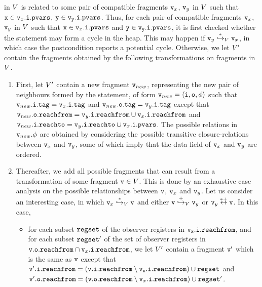 in $\fragset$ is related to some pair of compatible fragments $\frag_x$, $\frag_y$ in $\fragset$ such that $\lvarof{x} \in \pvarsat{\inof{\frag_x}}$, $\tt y \in \pvarsat{\inof{\frag_y}}$. 
Thus, for each pair of compatible fragments $\frag_x$, $\frag_y$ in $\fragset$ such that $\lvarof{x} \in \pvarsat{\inof{\frag_x}}$ and $\tt y \in \pvarsat{\inof{\frag_y}}$, it is first checked whether the statement may form
a cycle in the heap. This may happen if
$\frag_y \overset{*}\hookrightarrow_{\fragset}\frag_x$, in which case the postcondition reports a potential cycle.
Otherwise, we let $\fragsetpost$ contain
the fragments obtained by the following transformations on fragments in
$\fragset$.
\begin{enumerate}
  \item
    First, let $\fragsetpost$ contain a new fragment $\frag_{new}$, representing
    the new pair of neighbours formed by the statement, of form
    $\frag_{new} = \fragtupleat{\frag_{new}}$ such that
    $\tagat{\inof{\frag_{new}}} = \tagat{\inof{\frag_x}}$ and
    $\tagat{\outof{\frag_{new}}} = \tagat{\inof{\frag_y}}$ except that
    $\reachfromat{\outof{\frag_{new}}} = \reachfromat{\inof{\frag_y}} \cup \reachfromat{\inof{\frag_x}}$ and
    $\reachtoat{\inof{\frag_{new}}} = \reachtoat{\inof{\frag_y}} \cup \pvarsat{\inof{\frag_x}}$.
    The possible relations in $\datarelof{\frag_{new}}$ are obtained by
    considering the possible transitive closure-relations between
    $\frag_x$ and $\frag_y$, some of which imply that the data field of
    $\frag_x$ and $\frag_y$ are ordered.
  \item
    Thereafter, we add all possible fragments that can result from a transformation
of some fragment $\frag \in \fragset$. This is done by an exhaustive
case analysis on the possible
relationships between $\frag$, $\frag_x$ and $\frag_y$.
Let us consider an interesting case, in which
$\frag_x \overset{*}\hookrightarrow_{\fragset} \frag$ and either $\frag \overset{+}\hookrightarrow_{\fragset} \frag_y$ or $\frag_y \overset{*+}\leftrightarrow \frag$.
In this case, 
\begin{itemize}
\item
  for each subset $\regset$ of the observer registers in $\tt \reachfromat{\inof{\frag_x}}$, and for each subset $\regset'$ of the set of observer registers in
  $\reachfromat{\outof{\frag}} \cap \reachfromat{\inof{\frag_x}}$,
  we let $\fragsetpost$ contain a fragment $\frag'$ which is the same as $\frag$
  except that
$\reachfromat{\inof{\frag'}} = (\tt \reachfromat{\inof{\frag}} \setminus \reachfromat{\inof{\frag_x}}) \cup \regset$ and $\reachfromat{\outof{\frag'}} = (\reachfromat{\outof{\frag}} \setminus \reachfromat{\inof{\frag_x}}) \cup \regset'$. 
\end{itemize}
\end{enumerate}

